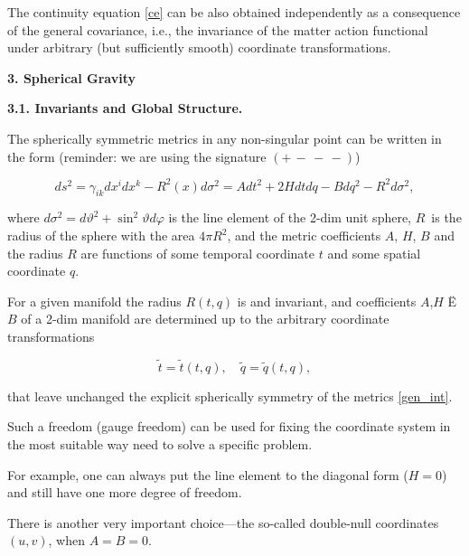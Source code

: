 The continuity equation \eqref{ce} can be also obtained independently as a consequence of the general covariance, i.e., the invariance of the matter action functional under arbitrary (but sufficiently smooth) coordinate transformations.



\smallskip 



\textbf{3. Spherical Gravity}



\textbf{3.1. Invariants and Global Structure.}

The spherically symmetric metrics in any non-singular point can be written in the form (reminder: we are using the signature $(+\,-\,-\,-)$)

\begin{equation}

\label{gen_int}

ds^2 = \gamma _{ik}dx^i dx^k -R^2(x)d\sigma ^2  =Adt^2+2Hdtdq-Bdq^2-R^2d\sigma ^2,

\end{equation}

where $d\sigma ^2=d\vartheta ^2 +\sin ^2 \vartheta d\varphi$ is the line element of the 2-dim unit sphere, $R$~is the radius of the sphere with the area $4\pi R^2$, and the metric coefficients $A$, $H$, $B$ and the radius $R$ are functions of some temporal coordinate $t$  and some spatial coordinate $q$.

For a given manifold the radius $R(t,q)$ is and invariant, and coefficients $A$,$H$ Ë $B$ of a 2-dim manifold are determined up to the arbitrary coordinate transformations

\begin{equation}

\label{gen_transf} \tilde t =\tilde t(t,q),\quad \tilde q = \tilde q(t,q),

\end{equation}

that leave unchanged the explicit spherically symmetry of the metrics \eqref{gen_int}. 

Such a freedom (gauge freedom) can be used for fixing the coordinate system in the most suitable way need to solve a specific problem.  

For example, one can always put the line element to the diagonal form ($H=0$) and still have one more degree of freedom. 

There is another very important choice---the so-called double-null coordinates  $(u, v)$, when $A=B=0$. 

